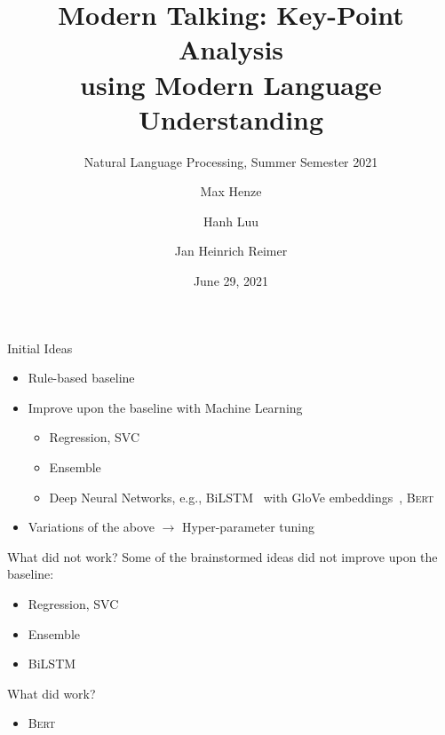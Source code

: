 \documentclass[english,handout]{mlutalk}
\title{%
  Modern Talking: Key-Point Analysis \\
  using Modern Language Understanding
}
\subtitle{Natural Language Processing, Summer Semester 2021}
\author{Max Henze \and Hanh Luu \and Jan Heinrich Reimer}
\institute{Martin Luther University Halle-Wittenberg}
\date{June 29, 2021}
\newcommand{\BiLSTM}{\mbox{BiLSTM}\xspace}
\newcommand{\Bert}{\textsc{Bert}\xspace}
\begin{document}
\titleframe

\begin{frame}{Initial Ideas}
  
  \begin{itemize}
    \item Rule-based baseline
    \item Improve upon the baseline with Machine Learning
    \begin{itemize}
      \item Regression, SVC~\cite{CortesV1995}
      \item Ensemble
      \item Deep Neural Networks, e.g., \BiLSTM~\cite{SchusterP1997,HochreiterS1997} with GloVe embeddings~\cite{PenningtonSM2014}, \Bert~\cite{DevlinCLT2018}
    \end{itemize}
    \item Variations of the above \(\to\) Hyper-parameter tuning
  \end{itemize}
  
  \begin{block}{What did not work?}
    Some of the brainstormed ideas did not improve upon the baseline:
    \begin{itemize}
      \item Regression, SVC
      \item Ensemble
      \item \BiLSTM
    \end{itemize}
  \end{block}
  
  \begin{block}{What did work?}
    \begin{itemize}
      \item \Bert
    \end{itemize}
  \end{block}

\end{frame}
\end{document}
